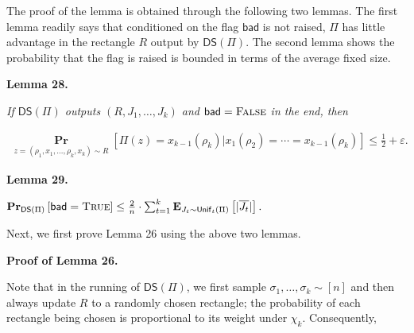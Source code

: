The proof of the lemma is obtained through the following two lemmas.
The first lemma readily says that conditioned on the flag $\mathsf{bad}$ is not raised, $\Pi$ has little advantage in the rectangle $R$ output by $\mathsf{DS}(\Pi)$.
The second lemma shows the probability that the flag is raised is bounded in terms of the average fixed size.\par





\par\medskip\noindent\textbf{
\textbf{Lemma 28}\textbf{.}
}\par



\emph{If $\mathsf{DS}(\Pi)$ outputs $(R,J_{1},\dots,J_{k})$ and $\mathsf{bad}=\textsc{False}$ in the end, then}\par


\[\begin{gathered}
\operatorname*{\mathbf{Pr}}_{z=(\rho_{1},x_{1},\dots,\rho_{k},x_{k})\sim R}\left[\Pi(z)=x_{k-1}(\rho_{k})|x_{1}(\rho_{2})=\cdots=x_{k-1}(\rho_{k})\right]\leq\frac{1}{2}+\varepsilon.
\end{gathered}\]







\par\medskip\noindent\textbf{
\textbf{Lemma 29}\textbf{.}
}\par



$\operatorname*{\mathbf{Pr}}_{\mathsf{DS}(\Pi)}\left[\mathsf{bad}=\textsc{True}\right]\leq\frac{2}{n}\cdot\sum_{t=1}^{k}\operatorname*{\mathbf{E}}_{J_{t}\sim\mathsf{Unif}_{t}(\Pi)}\left[|\overline{J_{t}}|\right].$\emph{}\par






Next, we first prove Lemma 26 using the above two lemmas.\par




\par\medskip\noindent\textbf{Proof of Lemma 26.}\par




Note that in the running of $\mathsf{DS}(\Pi)$,
we first sample $\sigma_{1},\dots,\sigma_{k}\sim[n]$ and then
always update $R$ to a randomly chosen rectangle; the probability of each rectangle being chosen is proportional to its weight under $\chi_{k}$.
Consequently,\par




